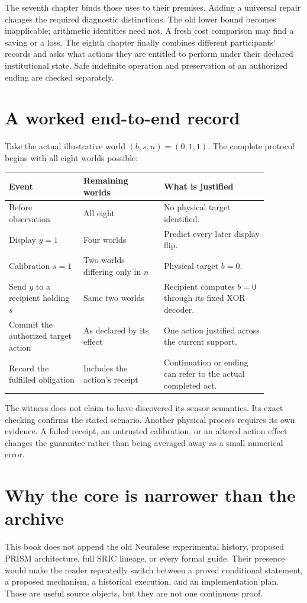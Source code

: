 The seventh chapter binds those uses to their premises. Adding a universal repair changes the required diagnostic distinctions. The old lower bound becomes inapplicable; arithmetic identities need not. A fresh cost comparison may find a saving or a loss. The eighth chapter finally combines different participants' records and asks what actions they are entitled to perform under their declared institutional state. Safe indefinite operation and preservation of an authorized ending are checked separately.

\section{A worked end-to-end record}
Take the actual illustrative world $(b,s,n)=(0,1,1)$. The complete protocol begins with all eight worlds possible:
\begin{center}\begin{tabular}{p{0.25\linewidth}p{0.27\linewidth}p{0.35\linewidth}}\toprule
Event & Remaining worlds & What is justified\\\midrule
Before observation & All eight & No physical target identified.\\
Display $y=1$ & Four worlds & Predict every later display flip.\\
Calibration $s=1$ & Two worlds differing only in $n$ & Physical target $b=0$.\\
Send $y$ to a recipient holding $s$ & Same two worlds & Recipient computes $b=0$ through its fixed XOR decoder.\\
Commit the authorized target action & As declared by its effect & One action justified across the current support.\\
Record the fulfilled obligation & Includes the action's receipt & Continuation or ending can refer to the actual completed act.\\\bottomrule\end{tabular}\end{center}

The witness does not claim to have discovered its sensor semantics. Its exact checking confirms the stated scenario. Another physical process requires its own evidence. A failed receipt, an untrusted calibration, or an altered action effect changes the guarantee rather than being averaged away as a small numerical error.

\section{Why the core is narrower than the archive}
This book does not append the old Neuralese experimental history, proposed PRISM architecture, full SRIC lineage, or every formal guide. Their presence would make the reader repeatedly switch between a proved conditional statement, a proposed mechanism, a historical execution, and an implementation plan. Those are useful source objects, but they are not one continuous proof.

